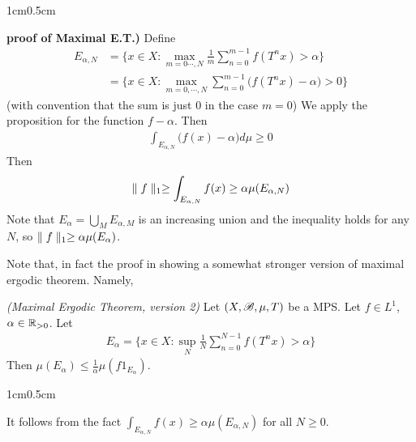 \documentclass[10pt,a4paper]{report}
\newenvironment{proof}
{\begin{changemargin}{1cm}{0.5cm} 
	}%
	{\end{changemargin}
}
\begin{document}
\begin{proof}
\textbf{proof of Maximal E.T.)} Define
\begin{align*}
E_{\alpha,N} &= \{x\in X : \max_{m=0\cdots, N} \frac{1}{m} \sum_{n=0}^{m-1} f(T^n x) >\alpha   \} \\
&= \{x\in X: \max_{m=0,\cdots,N} \sum_{n=0}^{m-1} \big( f(T^n x) - \alpha \big) > 0 \}
\end{align*}
(with convention that the sum is just 0 in the case $m=0$) We apply the proposition for the function $f-\alpha$. Then
\begin{align*}
\int_{E_{\alpha, N}} \big( f(x) - \alpha \big) d\mu \geq 0
\end{align*}
Then
\begin{align*}
\parallel f \parallel_{1} \geq  \int_{E_{\alpha, N}} f(x) \geq \alpha \mu(E_{\alpha,N}) 
\end{align*}
Note that $E_{\alpha} = \bigcup_{M} E_{\alpha,M}$ is an increasing union and the inequality holds for any $N$, so $\parallel f \parallel_{1} \geq \alpha\mu(E_{\alpha})$.

\eop
\end{proof}
\s

Note that, in fact the proof in showing a somewhat stronger version of maximal ergodic theorem. Namely,
\s

\thm \emph{(Maximal Ergodic Theorem, version 2)} Let $(X,\mathscr{B}, \mu, T)$ be a MPS. Let $f\in L^1$, $\alpha\in \mathbb{R}_{>0}$. Let
\begin{align*}
E_{\alpha} = \{x\in X : \sup_N \frac{1}{N} \sum_{n=0}^{N-1} f(T^n x) > \alpha \}
\end{align*}
Then $\mu(E_{\alpha}) \leq \frac{1}{\alpha} \mu(f 1_{E_{\alpha}} )$.
\begin{proof}
\pf It follows from the fact $\int_{E_{\alpha, N}} f(x) \geq \alpha \mu(E_{\alpha,N}) $ for all $N\geq 0$.

\eop
\end{proof}
\s
\end{document}
